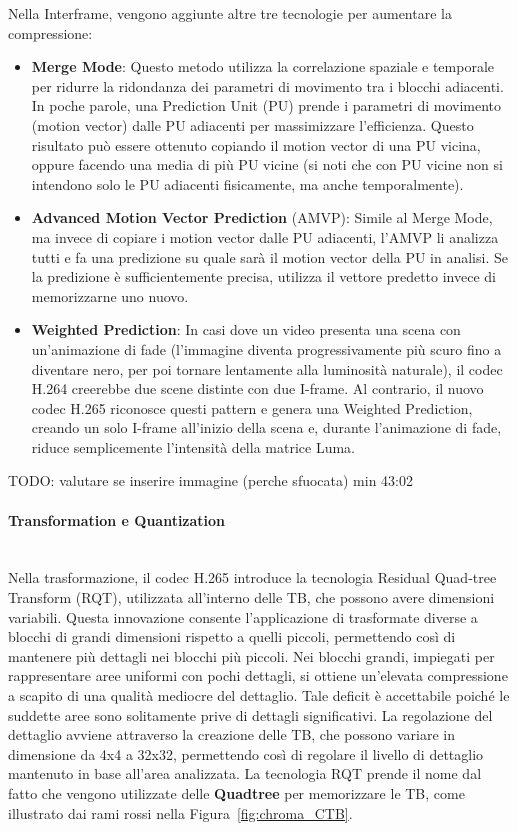 \documentclass[a4paper,12pt, oneside]{article}
\begin{document}
Nella Interframe, vengono aggiunte altre tre tecnologie per aumentare la compressione:

\begin{itemize}
    \item \textbf{Merge Mode}: Questo metodo utilizza la correlazione spaziale e temporale per ridurre la
    ridondanza dei parametri di movimento tra i blocchi adiacenti. In poche parole, una Prediction Unit
    (PU) prende i parametri di movimento (motion vector) dalle PU adiacenti per massimizzare l'efficienza.
    Questo risultato può essere ottenuto copiando il motion vector di una PU vicina, oppure facendo una
    media di più PU vicine (si noti che con PU vicine non si intendono solo le PU adiacenti fisicamente, ma
    anche temporalmente).
    
    \item \textbf{Advanced Motion Vector Prediction} (AMVP): Simile al Merge Mode, ma invece di copiare i
    motion vector dalle PU adiacenti, l'AMVP li analizza tutti e fa una predizione su quale sarà il motion
    vector della PU in analisi. Se la predizione è sufficientemente precisa, utilizza il vettore predetto
    invece di memorizzarne uno nuovo.
    
    \item \textbf{Weighted Prediction}: In casi dove un video presenta una scena con un'animazione di fade
    (l'immagine diventa progressivamente più scuro fino a diventare nero, per poi tornare lentamente alla
    luminosità naturale), il codec H.264 creerebbe due scene distinte con due I-frame. Al contrario, il
    nuovo codec H.265 riconosce questi pattern e genera una Weighted Prediction, creando un solo I-frame
    all'inizio della scena e, durante l'animazione di fade, riduce semplicemente l'intensità della matrice
    Luma.
\end{itemize}

TODO: valutare se inserire immagine (perche sfuocata) min 43:02

\paragraph{Transformation e Quantization}\hphantom{A}\\
Nella trasformazione, il codec H.265 introduce la tecnologia Residual Quad-tree Transform (RQT), utilizzata
all'interno delle TB, che possono avere dimensioni variabili. Questa innovazione consente l'applicazione di
trasformate diverse a blocchi di grandi dimensioni rispetto a quelli piccoli, permettendo così di mantenere
più dettagli nei blocchi più piccoli. Nei blocchi grandi, impiegati per rappresentare aree uniformi con
pochi dettagli, si ottiene un'elevata compressione a scapito di una qualità mediocre del dettaglio. Tale
deficit è accettabile poiché le suddette aree sono solitamente prive di dettagli significativi. La
regolazione del dettaglio avviene attraverso la creazione delle TB, che possono variare in dimensione
da 4x4 a 32x32, permettendo così di regolare il livello di dettaglio mantenuto in base all'area analizzata.
La tecnologia RQT prende il nome dal fatto che vengono utilizzate delle \textbf{Quadtree} per memorizzare
le TB, come illustrato dai rami rossi nella Figura~\ref{fig:chroma_CTB}.
\end{document}
